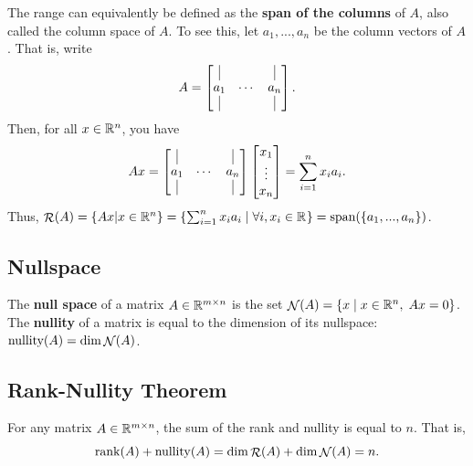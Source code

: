 \documentclass[12pt]{article}
\begin{document}
The range can equivalently be defined as the \textbf{span of the columns} of $A$, also called the column space of $A$. To see this, let $a_1, ..., a_n$ be the column vectors of $A$. That is, write
%
\begin{equation*}
A = \left[ \begin{matrix}
\vline & & \vline \\
a_1 & \cdots & a_n \\
\vline & & \vline
\end{matrix}\right].
\end{equation*}
%
Then, for all $x \in { {\mathbb R}^{n} }$, you have
%
\begin{equation*}
Ax = \left[ \begin{matrix}
\vline & & \vline \\
a_1 & \cdots & a_n \\
\vline & & \vline
\end{matrix}\right] \left[ \begin{matrix}
x_1 \\
\vdots \\
x_n
\end{matrix}\right]  = \sum_{i=1}^n x_i a_i.
\end{equation*}
%
Thus, $\mathop{\mathcal{R}}\nolimits(A) = \{Ax | x \in { {\mathbb R}^{n} } \} = \{\sum_{i=1}^n x_i a_i \; | \; \forall i, x_i \in { {\mathbb R}^{} }\} = \text{span}(\{a_1, ..., a_n\})$. 

\subsection{Nullspace}

The \textbf{null space} of a matrix $A \in { {\mathbb R}^{m\times n} }$ is the set $\mathop{\mathcal{N}}\nolimits(A) = \{x \; | \; x \in { {\mathbb R}^{n} }, \; Ax = 0\}$. The \textbf{nullity} of a matrix is equal to the dimension of its nullspace: $\text{nullity}(A) = \dim \mathop{\mathcal{N}}\nolimits(A)$. 


\subsection{Rank-Nullity Theorem}
\begin{theorem} For any matrix $A \in { {\mathbb R}^{m \times n} }$, the sum of the rank and nullity is equal to $n$. That is,
%
\begin{equation*}
\mathop{\mathrm{rank}}\nolimits(A) + \text{\textnormal{nullity}}(A) = \dim \mathop{\mathcal{R}}\nolimits(A) + \dim \mathop{\mathcal{N}}\nolimits(A) = n.
\end{equation*}
\end{theorem}
\end{document}
